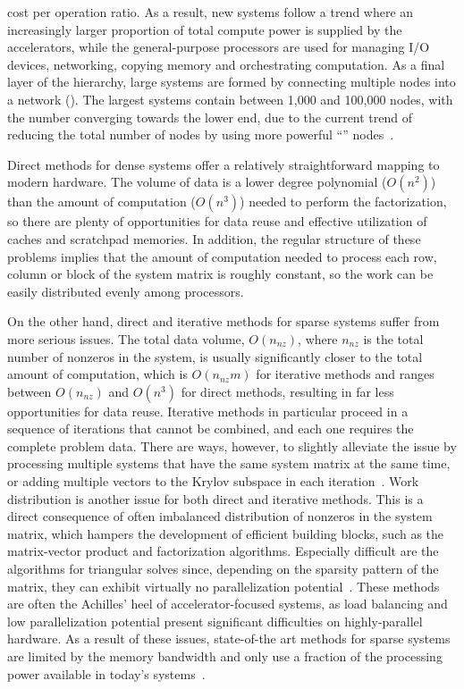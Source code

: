 cost per operation ratio. As a result, new systems follow a trend where an
increasingly larger proportion of total compute power is supplied by the
accelerators, while the general-purpose processors are used for managing I/O
devices, networking, copying memory and orchestrating computation. As a final
layer of the hierarchy, large systems are formed by connecting multiple nodes
into a network (). The largest systems contain between 1,000
and 100,000 nodes,
with the number converging towards the lower end, due to the current trend of
reducing the total number of nodes by using more powerful ``''
nodes~\cite{top500}.

Direct methods for dense systems offer a relatively straightforward mapping to
modern hardware. The volume of data is a lower degree polynomial
($O(n^2)$) than the amount of computation ($O(n^3)$) needed to perform the
factorization, so there are plenty of opportunities for data reuse and effective
utilization of caches and scratchpad memories. In addition, the regular
structure of these problems implies that the amount of computation needed to
process each row, column or block of the system matrix is roughly constant, so
the work can be easily distributed evenly among processors.

On the other hand, direct and iterative methods for sparse systems suffer from
more serious issues. The total data volume, $O(n_{nz})$, where $n_{nz}$ is
the total number of nonzeros in the system, is usually significantly closer to
the total amount of computation, which is $O(n_{nz} m)$ for iterative
methods and ranges between $O(n_{nz})$ and $O(n^3)$ for direct methods,
resulting in far less opportunities for data reuse. Iterative methods in
particular proceed in a sequence of iterations that cannot be combined, and each
one requires the complete problem data. There are ways, however, to slightly
alleviate the issue by processing multiple systems that have the same system
matrix at the same time, or adding multiple vectors to the Krylov subspace in
each iteration~\cite{ca-gmres}. Work distribution is another issue for both
direct and iterative methods. This is a direct consequence of often imbalanced
distribution of nonzeros in the system matrix, which hampers the development of
efficient building blocks, such as the matrix-vector product and factorization
algorithms. Especially difficult are the algorithms for triangular solves since,
depending on the sparsity pattern of the matrix, they can exhibit virtually no
parallelization potential~\cite{triangular-solves}. These methods are often the
Achilles' heel of accelerator-focused systems, as load balancing and low
parallelization potential present significant difficulties on highly-parallel
hardware.  As a result of these issues, state-of-the art methods for sparse
systems are limited by the memory bandwidth and only use a fraction of the
processing power available in today's systems~\cite{top500}.
